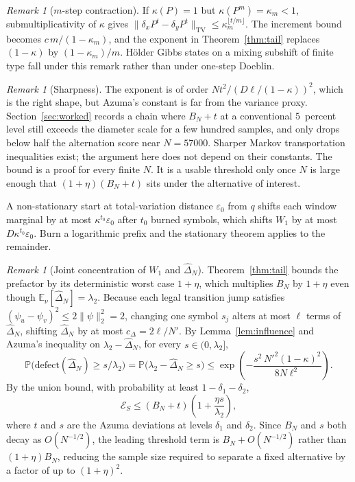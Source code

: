 \documentclass[11pt,reqno]{amsart}
\theoremstyle{remark}
\newtheorem{remark}[theorem]{Remark}
\newcommand{\ES}{\mathcal{E}_S}
\newcommand{\TV}{\mathrm{TV}}
\newcommand{\defect}{\mathrm{defect}}
\begin{document}
\begin{remark}[$m$-step contraction]\label{rem:m-step}
If $\kappa(P) = 1$ but $\kappa(P^m) = \kappa_m < 1$, submultiplicativity of $\kappa$ gives $\|\delta_x P^{t} - \delta_y P^{t}\|_{\TV} \le \kappa_m^{\lfloor t/m \rfloor}$. The increment bound becomes $c \, m / (1-\kappa_m)$, and the exponent in Theorem~\ref{thm:tail} replaces $(1-\kappa)$ by $(1-\kappa_m)/m$. H\"older Gibbs states on a mixing subshift of finite type fall under this remark rather than under one-step Doeblin.
\end{remark}

\begin{remark}[Sharpness]\label{rem:sharpness}
The exponent is of order $N t^2 / (D \ell /(1-\kappa))^2$, which is the right shape, but Azuma's constant is far from the variance proxy. Section~\ref{sec:worked} records a chain where $B_N + t$ at a conventional $5$~percent level still exceeds the diameter scale for a few hundred samples, and only drops below half the alternation score near $N = 57000$. Sharper Markov transportation inequalities exist; the argument here does not depend on their constants. The bound is a proof for every finite $N$. It is a usable threshold only once $N$ is large enough that $(1+\eta)(B_N+t)$ sits under the alternative of interest.

A non-stationary start at total-variation distance $\varepsilon_0$ from $q$ shifts each window marginal by at most $\kappa^{t_0}\varepsilon_0$ after $t_0$ burned symbols, which shifts $W_1$ by at most $D \kappa^{t_0}\varepsilon_0$. Burn a logarithmic prefix and the stationary theorem applies to the remainder.
\end{remark}

\begin{remark}[Joint concentration of $W_1$ and $\hat\Delta_N$]\label{rem:joint}
Theorem~\ref{thm:tail} bounds the prefactor by its deterministic worst case $1+\eta$, which multiplies $B_N$ by $1+\eta$ even though $\mathbb{E}_\nu[\hat\Delta_N] = \lambda_2$. Because each legal transition jump satisfies $(\psi_u - \psi_v)^2 \le 2\|\psi\|_2^2 = 2$, changing one symbol $s_j$ alters at most $\ell$ terms of $\hat\Delta_N$, shifting $\hat\Delta_N$ by at most $c_\Delta = 2\ell/N'$. By Lemma~\ref{lem:influence} and Azuma's inequality on $\lambda_2 - \hat\Delta_N$, for every $s \in (0,\lambda_2]$,
\[
\mathbb{P}\bigl(\defect(\hat\Delta_N) \ge s/\lambda_2\bigr)
=
\mathbb{P}\bigl(\lambda_2 - \hat\Delta_N \ge s\bigr)
\le
\exp\left(
-\frac{s^2 \, N'^2 (1-\kappa)^2}{8 N \ell^2}
\right).
\]
By the union bound, with probability at least $1 - \delta_1 - \delta_2$,
\[
\ES
\le
(B_N + t)\left(1 + \frac{\eta s}{\lambda_2}\right),
\]
where $t$ and $s$ are the Azuma deviations at levels $\delta_1$ and $\delta_2$. Since $B_N$ and $s$ both decay as $O(N^{-1/2})$, the leading threshold term is $B_N + O(N^{-1/2})$ rather than $(1+\eta)B_N$, reducing the sample size required to separate a fixed alternative by a factor of up to $(1+\eta)^2$.
\end{remark}
\end{document}
